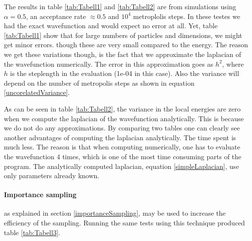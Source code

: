 \documentclass[english, a4paper]{article}
\begin{document}
The results in table \ref{tab:Tabell1} and \ref{tab:Tabell2} are from simulations using $\alpha=0.5$, an acceptance rate $\approx 0.5$ and  $10^4$ metroplolis steps.
In these testes we had the exact wavefunction and would expect no error at all. Yet, table \ref{tab:Tabell1} show that for large numbers of particles and dimensions, we might get minor errors. though these are very small compared to the energy. The reason we get these variations though, is the fact that we approximate the laplacian of the wavefunction numerically. The error in this approximation goes as $h^2$, where $h$ is the steplength in the evaluation (1e-04 in this case). 
Also the variance will depend on the number of metropolis steps as shown in equation \eqref{uncorelatedVariance}.
 
As can be seen in table \ref{tab:Tabell2}, the variance in the local energies are zero when we compute the laplacian of the wavefunction analytically.
This is because we do not do any approximations.  
By comparing two tables one can clearly see another advantages of computing the laplacian analytically. 
The time spent is much less. The reason is that when computing numerically, one has to evaluate the wavefunction 4 times, which is one of the most time consuming parts of the program. The analytically computed laplacian, equation \eqref{simpleLaplacian}, use only parameters already known. 


\paragraph{Importance sampling} as explained in section \ref{importanceSampling}, may be used to increase the efficiency of the sampling. Running the same tests using this technique produced table \ref{tab:Tabell3}.
\end{document}
